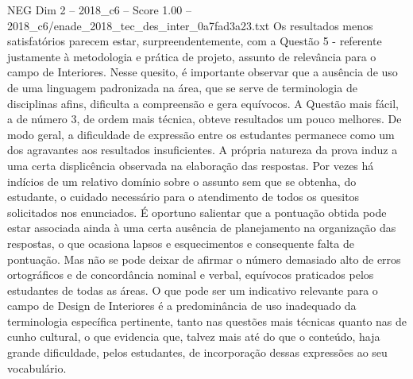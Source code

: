 \begin{textsample}{NEG Dim 2 – 2018\_c6 – Score 1.00 – 2018\_c6/enade\_2018\_tec\_des\_inter\_0a7fad3a23.txt}
Os resultados menos satisfatórios parecem estar, surpreendentemente, com a Questão 5 - referente justamente à metodologia e prática de projeto, assunto de relevância para o campo de Interiores.
Nesse quesito, é importante observar que a ausência de uso de uma linguagem padronizada na área, que se serve de terminologia de disciplinas afins, dificulta a compreensão e gera equívocos.
A Questão mais fácil, a de número 3, de ordem mais técnica, obteve resultados um pouco melhores.
De modo geral, a dificuldade de expressão entre os estudantes permanece como um dos agravantes aos resultados insuficientes.
A própria natureza da prova induz a uma certa displicência observada na elaboração das respostas.
Por vezes há indícios de um relativo domínio sobre o assunto sem que se obtenha, do estudante, o cuidado necessário para o atendimento de todos os quesitos solicitados nos enunciados.
É oportuno salientar que a pontuação obtida pode estar associada ainda à uma certa ausência de planejamento na organização das respostas, o que ocasiona lapsos e esquecimentos e consequente falta de pontuação.
Mas não se pode deixar de afirmar o número demasiado alto de erros ortográficos e de concordância nominal e verbal, equívocos praticados pelos estudantes de todas as áreas.
O que pode ser um indicativo relevante para o campo de Design de Interiores é a predominância de uso inadequado da terminologia específica pertinente, tanto nas questões mais técnicas quanto nas de cunho cultural, o que evidencia que, talvez mais até do que o conteúdo, haja grande dificuldade, pelos estudantes, de incorporação dessas expressões ao seu vocabulário.

\end{textsample}
